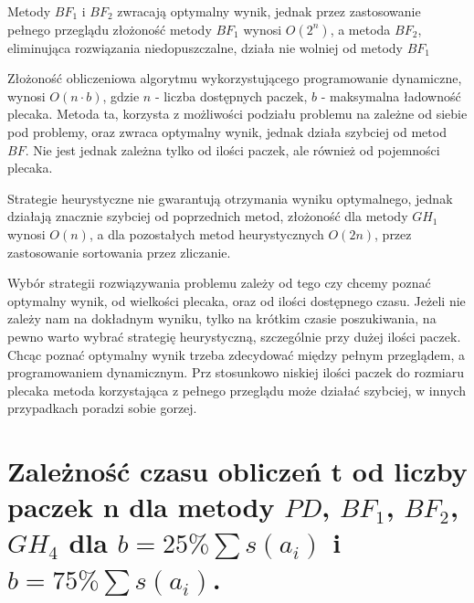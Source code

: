 \documentclass[polish,polish,a4paper]{article}
\begin{document}
\begin{spacing}{1.35}
	Metody $BF_{1}$ i $BF_{2}$ zwracają optymalny wynik, jednak przez zastosowanie pełnego przeglądu złożoność metody $BF_{1}$ wynosi $O(2^{n})$, a metoda $BF_{2}$, eliminująca rozwiązania niedopuszczalne, działa nie wolniej od metody $BF_{1}$
	
	Złożoność obliczeniowa algorytmu wykorzystującego programowanie dynamiczne, wynosi $O(n \cdot b)$, gdzie $n$ - liczba dostępnych paczek, $b$ - maksymalna ładowność plecaka. Metoda ta, korzysta z możliwości podziału problemu na zależne od siebie pod problemy, oraz zwraca optymalny wynik, jednak działa szybciej od metod $BF$. Nie jest jednak zależna tylko od ilości paczek, ale również od pojemności plecaka.
	
	Strategie heurystyczne nie gwarantują otrzymania wyniku optymalnego, jednak działają znacznie szybciej od poprzednich metod, złożoność dla metody $GH_{1}$ wynosi $O(n)$, a dla pozostałych metod heurystycznych $O(2n)$, przez zastosowanie sortowania przez zliczanie.
	
	Wybór strategii rozwiązywania problemu zależy od tego czy chcemy poznać optymalny wynik, od wielkości plecaka, oraz od ilości dostępnego czasu.
	Jeżeli nie zależy nam na dokładnym wyniku, tylko na krótkim czasie poszukiwania, na pewno warto wybrać strategię heurystyczną, szczególnie przy dużej ilości paczek.
	Chcąc poznać optymalny wynik trzeba zdecydować między pełnym przeglądem, a programowaniem dynamicznym. Prz stosunkowo niskiej ilości paczek do rozmiaru plecaka metoda korzystająca z pełnego przeglądu może działać szybciej, w innych przypadkach poradzi sobie gorzej.
	
	
	\section{Zależność czasu obliczeń t od liczby paczek n dla metody $PD$, $BF_{1}$, $BF_{2}$, $GH_{4}$ dla $b = 25 \% \sum s (a_{i})$ i $b = 75 \% \sum s (a_{i})$. }
	
		
	
	\begin{figure}[H]
		{\centering
}
\end{figure}
\end{spacing}
\end{document}
